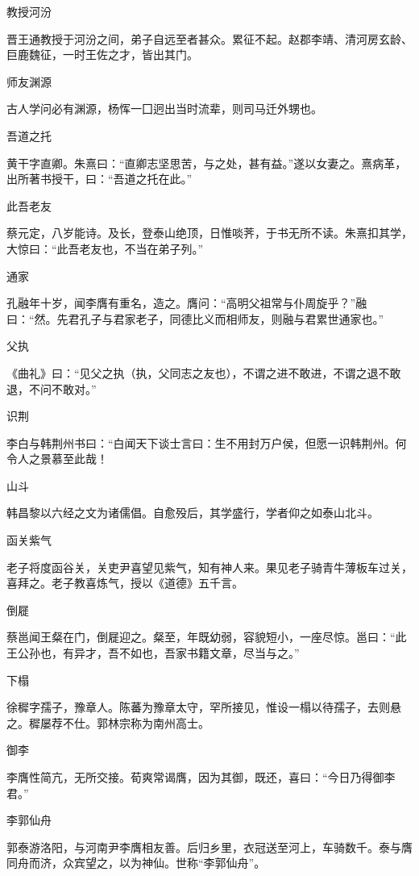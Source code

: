 \documentclass[a4paper,12pt,UTF8,twoside]{ctexbook}
\begin{document}
    教授河汾
    
    晋王通教授于河汾之间，弟子自远至者甚众。累征不起。赵郡李靖、清河房玄龄、巨鹿魏征，一时王佐之才，皆出其门。
    
    师友渊源
    
    古人学问必有渊源，杨恽一囗迥出当时流辈，则司马迁外甥也。
    
    吾道之托
    
    黄干字直卿。朱熹曰：“直卿志坚思苦，与之处，甚有益。”遂以女妻之。熹病革，出所著书授干，曰：“吾道之托在此。”
    
    此吾老友
    
    蔡元定，八岁能诗。及长，登泰山绝顶，日惟啖荠，于书无所不读。朱熹扣其学，大惊曰：“此吾老友也，不当在弟子列。”
    
    通家
    
    孔融年十岁，闻李膺有重名，造之。膺问：“高明父祖常与仆周旋乎？”融曰：“然。先君孔子与君家老子，同德比义而相师友，则融与君累世通家也。”
    
    父执
    
    《曲礼》曰：“见父之执（执，父同志之友也），不谓之进不敢进，不谓之退不敢退，不问不敢对。”
    
    识荆
    
    李白与韩荆州书曰：“白闻天下谈士言曰：生不用封万户侯，但愿一识韩荆州。何令人之景慕至此哉！
    
    山斗
    
    韩昌黎以六经之文为诸儒倡。自愈殁后，其学盛行，学者仰之如泰山北斗。
    
    函关紫气
    
    老子将度函谷关，关吏尹喜望见紫气，知有神人来。果见老子骑青牛薄板车过关，喜拜之。老子教喜炼气，授以《道德》五千言。
    
    倒屣
    
    蔡邕闻王粲在门，倒屣迎之。粲至，年既幼弱，容貌短小，一座尽惊。邕曰：“此王公孙也，有异才，吾不如也，吾家书籍文章，尽当与之。”
    
    下榻
    
    徐穉字孺子，豫章人。陈蕃为豫章太守，罕所接见，惟设一榻以待孺子，去则悬之。穉屡荐不仕。郭林宗称为南州高士。
    
    御李
    
    李膺性简亢，无所交接。荀爽常谒膺，因为其御，既还，喜曰：“今日乃得御李君。”
    
    李郭仙舟
    
    郭泰游洛阳，与河南尹李膺相友善。后归乡里，衣冠送至河上，车骑数千。泰与膺同舟而济，众宾望之，以为神仙。世称“李郭仙舟”。
    
\end{document}
